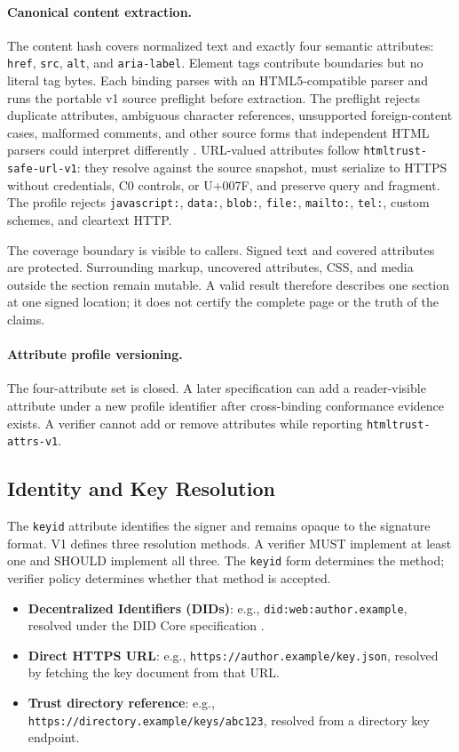 \documentclass{article}
\begin{document}
\paragraph{Canonical content extraction.} The content hash covers normalized text and exactly four semantic attributes: \texttt{href}, \texttt{src}, \texttt{alt}, and \texttt{aria-label}. Element tags contribute boundaries but no literal tag bytes. Each binding parses with an HTML5-compatible parser and runs the portable v1 source preflight before extraction. The preflight rejects duplicate attributes, ambiguous character references, unsupported foreign-content cases, malformed comments, and other source forms that independent HTML parsers could interpret differently \cite{WHATWGHTML}. URL-valued attributes follow \texttt{htmltrust-safe-url-v1}: they resolve against the source snapshot, must serialize to HTTPS without credentials, C0 controls, or U+007F, and preserve query and fragment. The profile rejects \texttt{javascript:}, \texttt{data:}, \texttt{blob:}, \texttt{file:}, \texttt{mailto:}, \texttt{tel:}, custom schemes, and cleartext HTTP.

The coverage boundary is visible to callers. Signed text and covered attributes are protected. Surrounding markup, uncovered attributes, CSS, and media outside the section remain mutable. A valid result therefore describes one section at one signed location; it does not certify the complete page or the truth of the claims.

\paragraph{Attribute profile versioning.} The four-attribute set is closed. A later specification can add a reader-visible attribute under a new profile identifier after cross-binding conformance evidence exists. A verifier cannot add or remove attributes while reporting \texttt{htmltrust-attrs-v1}.

\subsection{Identity and Key Resolution}
The \texttt{keyid} attribute identifies the signer and remains opaque to the signature format. V1 defines three resolution methods. A verifier MUST implement at least one and SHOULD implement all three. The \texttt{keyid} form determines the method; verifier policy determines whether that method is accepted.

\begin{itemize}
  \item \textbf{Decentralized Identifiers (DIDs)}: e.g., \texttt{did:web:author.example}, resolved under the DID Core specification \cite{DIDSpec}.
  \item \textbf{Direct HTTPS URL}: e.g., \texttt{https://author.example/key.json}, resolved by fetching the key document from that URL.
  \item \textbf{Trust directory reference}: e.g., \texttt{https://directory.example/keys/abc123}, resolved from a directory key endpoint.
\end{itemize}
\end{document}
